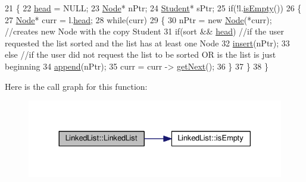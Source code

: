 \begin{DoxyCode}
21 \{
22    \hyperlink{classLinkedList_a35e09287e2d2943707b011208e7a8ed2}{head} = NULL;
23    \hyperlink{classNode}{Node}* nPtr;
24    \hyperlink{classStudent}{Student}* sPtr;
25    \textcolor{keywordflow}{if}(!l.\hyperlink{classLinkedList_a1b28b1e19e5aa68f3d89352e307928f6}{isEmpty}())
26    \{
27       \hyperlink{classNode}{Node}* curr = l.\hyperlink{classLinkedList_a35e09287e2d2943707b011208e7a8ed2}{head};
28       \textcolor{keywordflow}{while}(curr)
29       \{
30          nPtr = \textcolor{keyword}{new} \hyperlink{classNode_a0ac1d44cfe588be564acf25485029bd8}{Node}(*curr); \textcolor{comment}{//creates new Node with the copy Student                              
                                                                                                           }
31          \textcolor{keywordflow}{if}(sort && \hyperlink{classLinkedList_a35e09287e2d2943707b011208e7a8ed2}{head}) \textcolor{comment}{//if the user requested the list sorted and the list has at least one Node   
                                                                                                           }
32             \hyperlink{classLinkedList_a718246359a2199be67212703be951071}{insert}(nPtr);
33          \textcolor{keywordflow}{else} \textcolor{comment}{//if the user did not request the list to be sorted OR is the list is just beginning         
                                                                                                       }
34             \hyperlink{classLinkedList_ac2f92598858e9ba02af8722fba803c53}{append}(nPtr);
35          curr = curr -> \hyperlink{classNode_af8f2d178f274dd254e6e1965971f0fd0}{getNext}();
36       \}
37    \}
38 \}
\end{DoxyCode}


Here is the call graph for this function\+:
\nopagebreak
\begin{figure}[H]
\begin{center}
\leavevmode
\includegraphics[width=330pt]{classLinkedList_a6d0ec2b365564af3f855d245a85bcbef_cgraph}
\end{center}
\end{figure}


